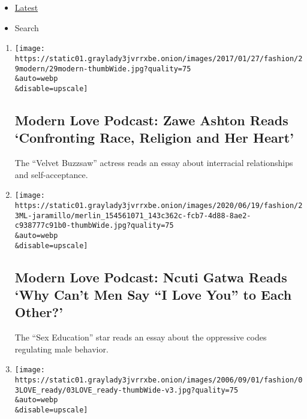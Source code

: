 \begin{itemize}
\tightlist
\item
  \protect\hyperlink{stream-panel}{Latest}
\item
  Search
\end{itemize}

\begin{enumerate}
\def\labelenumi{\arabic{enumi}.}
\item
  \href{/2020/06/24/style/modern-love-podcast-zawe-ashton.html}{}

  \texttt{[image: https://static01.graylady3jvrrxbe.onion/images/2017/01/27/fashion/29modern/29modern-thumbWide.jpg?quality=75\\\&auto=webp\\\&disable=upscale]}

  \hypertarget{modern-love-podcast-zawe-ashton-reads-confronting-race-religion-and-her-heart}{%
  \subsection{Modern Love Podcast: Zawe Ashton Reads `Confronting Race,
  Religion and Her
  Heart'}\label{modern-love-podcast-zawe-ashton-reads-confronting-race-religion-and-her-heart}}

  The ``Velvet Buzzsaw'' actress reads an essay about interracial
  relationships and self-acceptance.
\item
  \href{/2020/06/17/style/modern-love-podcast-ncuti-gatwa.html}{}

  \texttt{[image: https://static01.graylady3jvrrxbe.onion/images/2020/06/19/fashion/23ML-jaramillo/merlin\_154561071\_143c362c-fcb7-4d88-8ae2-c938777c91b0-thumbWide.jpg?quality=75\\\&auto=webp\\\&disable=upscale]}

  \hypertarget{modern-love-podcast-ncuti-gatwa-reads-why-cant-men-say-i-love-you-to-each-other}{%
  \subsection{Modern Love Podcast: Ncuti Gatwa Reads `Why Can't Men Say
  ``I Love You'' to Each
  Other?'}\label{modern-love-podcast-ncuti-gatwa-reads-why-cant-men-say-i-love-you-to-each-other}}

  The ``Sex Education'' star reads an essay about the oppressive codes
  regulating male behavior.
\item
  \href{/2020/06/10/style/modern-love-podcast-lorraine-toussant-updated-poscript.html}{}

  \texttt{[image: https://static01.graylady3jvrrxbe.onion/images/2006/09/01/fashion/03LOVE\_ready/03LOVE\_ready-thumbWide-v3.jpg?quality=75\\\&auto=webp\\\&disable=upscale]}


\end{enumerate}

